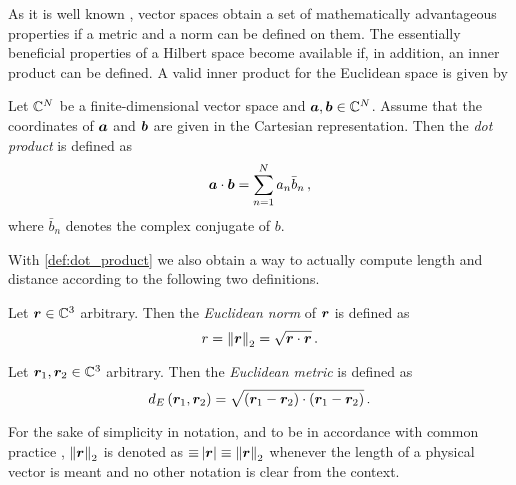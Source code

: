 As it is well known \cite{heuser2006}, vector spaces obtain a set of
mathematically advantageous properties if a metric and a norm can be defined on
them.
The essentially beneficial properties of a Hilbert space become available if,
in addition, an inner product can be defined.
A valid inner product for the Euclidean space is given by
\begin{definition}\label{def:dot_product}
	Let $\mathbb{C}^N$ be a finite-dimensional vector space and
	$\pvec{a}, \pvec{b} \in \C^N$.
	Assume that the coordinates of $\pvec{a}$ and $\pvec{b}$ are given in
	the Cartesian representation.
	Then the \emph{dot product}
	is defined as 
	\begin{equation}
		\pvec{a} \cdot \pvec{b} = \sum\limits_{n = 1}^{N} a_n \bar{b}_n \, ,
	\end{equation}
	where $\bar{b}_n$ denotes the complex conjugate of $b$.
\end{definition}

With \cref{def:dot_product} we also obtain a way to actually compute length
and distance according to the following two definitions.
\begin{definition}\label{def:euclidean_norm}
	Let $\pvec{r} \in \C^3$ arbitrary. Then the \emph{Euclidean norm} of
	$\pvec{r}$ is defined as
	\begin{equation}
		r = \euclideanNorm{\pvec{r}} = \sqrt{\pvec{r} \cdot \pvec{r}} \, .
	\end{equation}
\end{definition}

\begin{definition}\label{def:euclidean_metric}
	Let $\pvec{r}_1, \pvec{r}_2 \in \C^3$ arbitrary. Then the \emph{Euclidean
	metric} is defined as
	\begin{equation}
		d_E\left(\pvec{r}_1 , \pvec{r}_2\right) = 
		\sqrt{
			\left(\pvec{r}_1 - \pvec{r}_2\right)
			\cdot
			\left(\pvec{r}_1 - \pvec{r}_2\right)
		} \, .
	\end{equation}
\end{definition}

\begin{remark}
	For the sake of simplicity in notation, and to be in accordance with
	common practice \cite{vanBladel2007}, $\euclideanNorm{\robs}$ is
	denoted as $\pvec \equiv \abs{\robs} \equiv \euclideanNorm{\robs}$
	whenever the length of a physical vector is meant
	and no other notation is clear from the context.
\end{remark}








